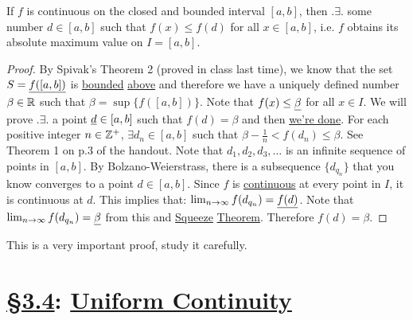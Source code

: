 \documentclass[]{article}
\begin{document}
\begin{recall}
	 If $f$ is continuous on the closed and bounded interval $[a,b]$, then $.\exists.$ some number $d\in[a,b]$ such that $f(x) \leq f(d)$ for all $x\in[a,b]$, i.e. $f$ obtains its absolute maximum value on $I = [a,b]$.
\end{recall}
\begin{proof}
	By Spivak's Theorem 2 (proved in class last time), we know that the set $S=\underline{f([a,b])}$ is \ul{bounded} \ul{above} and therefore we have a uniquely defined number $\beta\in\mathbb{R}$ such that \ul{$\beta = \sup{\{f([a,b])\}}$}.
	Note that $f(x) \leq \underline{\beta}$ for all $x\in I$. We will prove $.\exists.$ a point $\underline{d}\in[a,b]$ such that \ul{$f(d) = \beta$} and then \ul{we're done}.
	For each positive integer $n\in\mathbb{Z}^+$, $\exists d_n\in[a,b]$ such that \ul{$\beta-\frac{1}{n}<f(d_n)\leq \beta$}. See Theorem 1 on p.3 of the  handout. Note that $d_1,d_2,d_3,\dots$ is an infinite sequence of points in \ul{$[a,b]$}. By Bolzano-Weierstrass, there is a subsequence \ul{$\{d_{q_n}\}$} that you know converges to a point $d\in[a,b]$. Since $f$ is \ul{continuous} at every point in $I$, it is continuous at $d$. This implies that: $\lim_{n\rightarrow\infty} f(d_{q_n}) = \underline{f(d)}$. Note that $\lim_{n\rightarrow\infty} f(d_{q_n}) = \underline{\beta}$ from this and \ul{Squeeze} \ul{Theorem}. Therefore \ul{$f(d) = \beta$}.
\end{proof}
\begin{remark}
	This is a very important proof, study it carefully.
\end{remark}

\section*{\ul{\S3.4}: \ul{Uniform Continuity}}
\end{document}
